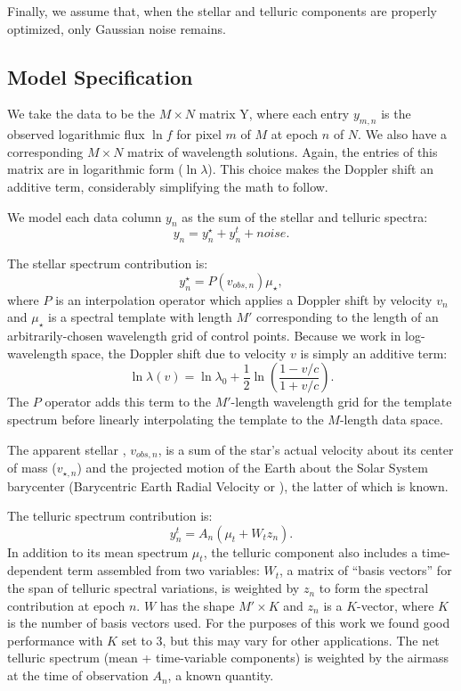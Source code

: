\documentclass[modern]{aastex62}
\begin{document}
Finally, we assume that, when the stellar and telluric components are properly optimized, only Gaussian noise remains.

\subsection{Model Specification}
\label{s:model-eqns}

We take the data to be the $M \times N$ matrix Y, where each entry $y_{m,n}$ is the observed logarithmic flux $\ln f$ for pixel $m$ of $M$ at epoch $n$ of $N$.
We also have a corresponding $M \times N$ matrix of wavelength solutions.
Again, the entries of this matrix are in logarithmic form ($\ln \lambda$).
This choice makes the Doppler shift an additive term, considerably simplifying the math to follow.

We model each data column $y_n$ as the sum of the stellar and telluric spectra:
\begin{equation}
y_n = y_{n}^\star + y_{n}^t + noise.
\end{equation}

The stellar spectrum contribution is:
\begin{equation}
y_{n}^\star = P(v_{obs, n}) \mu_{\star},
\end{equation}
where $P$ is an interpolation operator which applies a Doppler shift by velocity $v_n$ and $\mu_{\star}$ is a spectral template with length $M'$ corresponding to the length of an arbitrarily-chosen wavelength grid of control points.
Because we work in log-wavelength space, the Doppler shift due to velocity $v$ is simply an additive term:
\begin{equation}
 \ln \lambda(v) = \ln \lambda_{0} + \frac{1}{2} \ln \left(\frac{1 - v/c}{1 + v/c}\right).
\end{equation}
The $P$ operator adds this term to the $M'$-length wavelength grid for the template spectrum before linearly interpolating the template to the $M$-length data space.

The apparent stellar \RV, $v_{obs, n}$, is a sum of the star's actual velocity about its center of mass ($v_{\star, n}$) and the projected motion of the Earth about the Solar System barycenter (Barycentric Earth Radial Velocity or \BERV), the latter of which is known.

The telluric spectrum contribution is:
\begin{equation}
y_{n}^t =  A_n(\mu_{t} + W_{t} z_n).
\end{equation}
In addition to its mean spectrum $\mu_t$, the telluric component also includes a time-dependent term assembled from two variables: $W_t$, a matrix of ``basis vectors'' for the span of telluric spectral variations, is weighted by $z_n$ to form the spectral contribution at epoch $n$.
$W$ has the shape $M' \times K$ and $z_n$ is a $K$-vector, where $K$ is the number of basis vectors used.
For the purposes of this work we found good performance with $K$ set to 3, but this may vary for other applications.
The net telluric spectrum (mean + time-variable components) is weighted by the airmass at the time of observation $A_n$, a known quantity.
\end{document}
